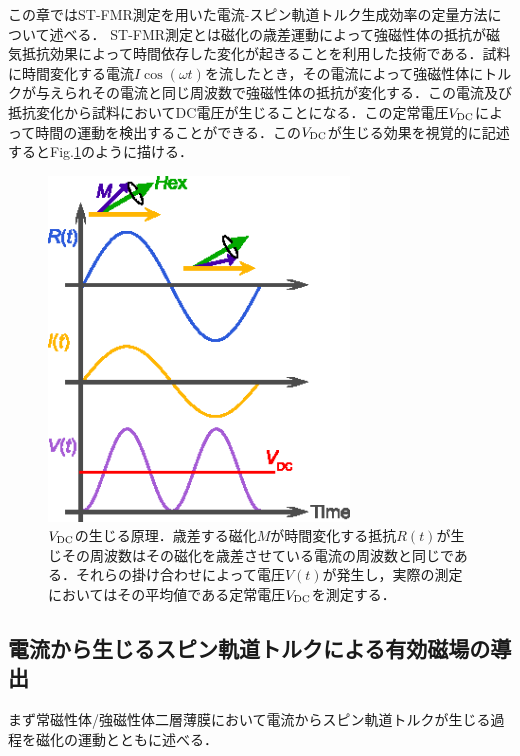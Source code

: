 この章ではST-FMR測定を用いた電流-スピン軌道トルク生成効率の定量方法について述べる．
ST-FMR測定とは磁化の歳差運動によって強磁性体の抵抗が磁気抵抗効果によって時間依存した変化が起きることを利用した技術である．試料に時間変化する電流$I\cos (\omega t)$を流したとき，その電流によって強磁性体にトルクが与えられその電流と同じ周波数で強磁性体の抵抗が変化する．この電流及び抵抗変化から試料においてDC電圧が生じることになる．この定常電圧$V_{\rm DC}$によって時間の運動を検出することができる．この$V_{\rm DC}$が生じる効果を視覚的に記述するとFig.\ref{fig:frequencymix}のように描ける．

\begin{figure}[htbp]
 \begin{center}
  \includegraphics[width=8cm]{images/frequencymix.eps}
 \end{center}
 \caption{$V_{\rm DC}$の生じる原理．歳差する磁化$M$が時間変化する抵抗$R(t)$が生じその周波数はその磁化を歳差させている電流の周波数と同じである．それらの掛け合わせによって電圧$V(t)$が発生し，実際の測定においてはその平均値である定常電圧$V_{\rm DC}$を測定する．}
 \label{fig:frequencymix}
\end{figure}

\subsection{電流から生じるスピン軌道トルクによる有効磁場の導出}
まず常磁性体/強磁性体二層薄膜において電流からスピン軌道トルクが生じる過程を磁化の運動とともに述べる．

